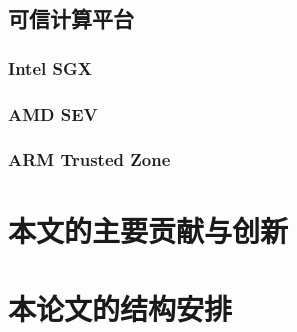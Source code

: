 \subsection{可信计算平台}
\subsubsection{Intel SGX}
\subsubsection{AMD SEV}
\subsubsection{ARM Trusted Zone}


\section{本文的主要贡献与创新}

\section{本论文的结构安排}